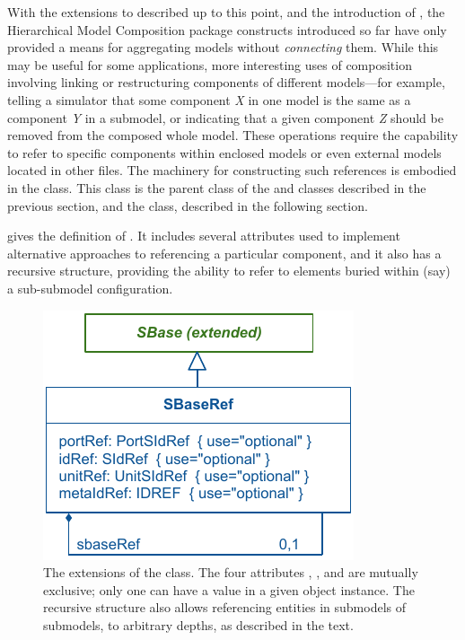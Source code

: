 With the extensions to \SBML described up to this point, and the
introduction of \ExternalModelDefinition, the Hierarchical Model
Composition package constructs introduced so far have only provided a
means for aggregating models without \emph{connecting} them.  While this
may be useful for some applications, more interesting uses of
composition involving linking or restructuring components of different
models---for example, telling a simulator that some component \emph{X}
in one model is the same as a component \emph{Y} in a submodel, or
indicating that a given component \emph{Z} should be removed from the
composed whole model.  These operations require the capability to refer
to specific components within enclosed models or even external models
located in other files.  The machinery for constructing such references
is embodied in the \SBaseRef class.  This class is the parent class of
the \Port and \Deletion classes described in the previous section, and
the \ReplacedElement class, described in the following section.

 gives the definition of \SBaseRef.  It includes
several attributes used to implement alternative approaches to
referencing a particular component, and it also has a recursive
structure, providing the ability to refer to elements buried within
(say) a sub-submodel configuration.

\begin{figure}[hbt]
  \includegraphics{figs/sbaseref-uml}
  \caption{The extensions of the \SBaseRef class.  The four attributes
    , ,  and 
    are mutually exclusive; only one can have a value in a given object
    instance.  The recursive structure also allows referencing entities
    in submodels of submodels, to arbitrary depths, as described in the
    text.}
  \label{sbaseref-uml}
\end{figure}

